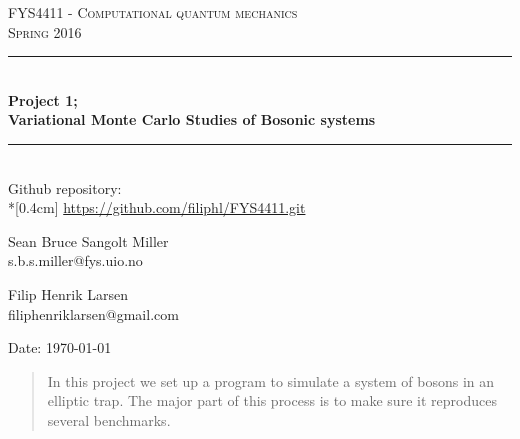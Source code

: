 \documentclass[english, a4paper]{article}
\begin{document}
\renewcommand{\figurename}{Figure}
\begin{titlepage}
\begin{center}

\textsc{\Large FYS4411 - Computational quantum mechanics }\\[0.5cm]
\textsc{\Large Spring 2016}\\[1.5cm]
\rule{\linewidth}{0.5mm} \\[0.4cm]
{ \huge \bfseries  Project 1;\\ Variational Monte Carlo Studies of Bosonic systems}\\[0.10cm]
\rule{\linewidth}{0.5mm} \\[1.5cm]

{\Large Github repository:} \\*[0.4cm]
\url{https://github.com/filiphl/FYS4411.git}

\vspace{13.5cm}

\begin{minipage}{\textwidth}
\begin{minipage}{0.49\textwidth}
    \begin{center} \large
        Sean Bruce Sangolt Miller\\
        {\footnotesize s.b.s.miller@fys.uio.no}
    \end{center}
\end{minipage}
\quad
\begin{minipage}{0.49\textwidth}
    \begin{center} \large
        Filip Henrik Larsen\\
        {\footnotesize filiphenriklarsen@gmail.com}
    \end{center}
\end{minipage}
\end{minipage}
\vfill

\large{Date: \today}

\end{center}
\end{titlepage}

\begin{abstract}
	In this project we set up a program to simulate a system of bosons in an elliptic trap. The major part of this process is to make sure it reproduces several benchmarks. 
\end{abstract}


\tableofcontents
\newpage
{}%
\end{document}
